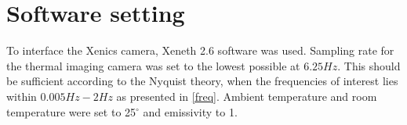 \section{Software setting}

To interface the Xenics camera, Xeneth 2.6 software was used.   
Sampling rate for the thermal imaging camera was set to the lowest possible at $6.25 Hz$. This should be sufficient according to the Nyquist theory\cite{weik2001}, when the frequencies of interest lies within $0.005 Hz-2 Hz$ as presented in \cref{freq}. Ambient temperature and room temperature were set to 25$^{\circ}$ and emissivity to 1.




